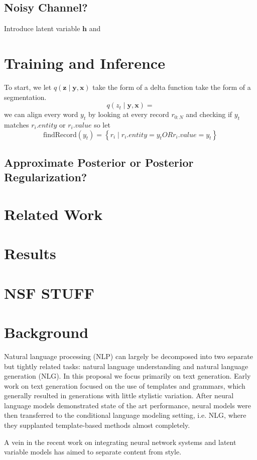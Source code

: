 \documentclass{article}
\newcommand\set[1]{\left\{#1\right\}}
\newcommand{\bh}{\mathbf{h}}
\newcommand{\bx}{\mathbf{x}}
\newcommand{\by}{\mathbf{y}}
\newcommand{\bz}{\mathbf{z}}
\begin{document}
\subsection{Noisy Channel?}
Introduce latent variable $\bh$ and 

\section{Training and Inference}
To start, we let $q(\bz\mid\by,\bx)$ take the form of a
delta function take the form of a segmentation.
$$q(z_t\mid\by,\bx)=$$
we can align every word $y_t$ by looking at every record $r_{0:N}$ and checking if $y_t$ matches $r_i.entity$ or $r_i.value$
so let
$$\textrm{findRecord}(y_t) = \set{ r_i \mid r_i.entity = y_t OR r_i.value = y_t }$$
\subsection{Approximate Posterior or Posterior Regularization?}

\section{Related Work}

\section{Results}

\section{NSF STUFF}
\section{Background}
Natural language processing (NLP) can largely be decomposed into two separate but
tightly related tasks: natural language understanding and natural language generation (NLG).
In this proposal we focus primarily on text generation.
Early work on text generation focused on the use of templates and grammars, 
which generally resulted in generations with little stylistic variation.
After neural language models demonstrated state of the art performance,
neural models were then transferred to the conditional language modeling setting,
i.e. NLG,
where they supplanted template-based methods almost completely.

A vein in the recent work on integrating neural network systems and latent variable models
has aimed to separate content from style.
\end{document}
